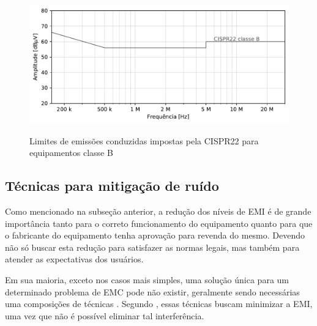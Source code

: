             \begin{figure}[H]
            	\centering
            	\caption{Limites de emissões conduzidas impostas pela CISPR22 para equipamentos classe B}
            	\includegraphics[scale=.9]{pdf/cond/norma_cond.pdf}
            	\label{fig:cispr22_cond}
            \end{figure}
            
            
            
            \subsection{Técnicas para mitigação de ruído} \label{cap:fund_emc_conv_mitig}
            
            Como mencionado na subseção anterior, a redução dos níveis de EMI é de grande importância tanto para o correto funcionamento do equipamento quanto para que o fabricante do equipamento tenha aprovação para revenda do mesmo. Devendo não só buscar esta redução para satisfazer as normas legais, mas também para atender as expectativas dos usuários. %
            
            Em sua maioria, exceto nos casos mais simples, uma solução única para um determinado problema de EMC pode não existir, geralmente sendo necessárias uma composições de técnicas \cite{ref:EMC_livro_NoiseReduct}. Segundo , essas técnicas buscam minimizar a EMI, uma vez que não é possível eliminar tal interferência.
            

